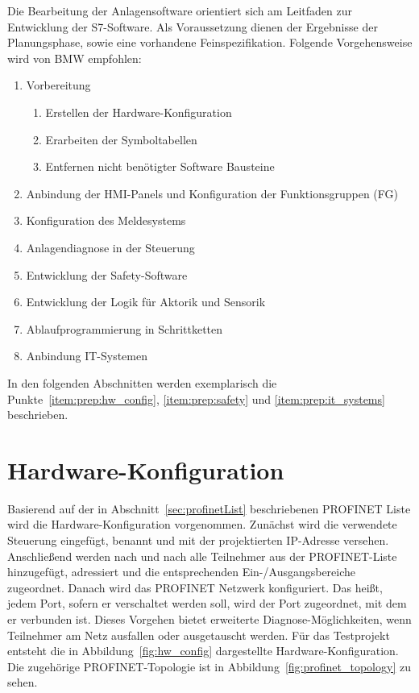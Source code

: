 Die Bearbeitung der Anlagensoftware orientiert sich am Leitfaden zur Entwicklung der S7-Software. Als Voraussetzung dienen der Ergebnisse der Planungsphase, sowie eine vorhandene Feinspezifikation. Folgende Vorgehensweise wird von BMW empfohlen:
\begin{enumerate}
    \itemsep 0.05em
    \item Vorbereitung
    \begin{enumerate}
        \itemsep 0.05em
        \item {Erstellen der Hardware-Konfiguration}\label{item:prep:hw_config}
        \item Erarbeiten der Symboltabellen
        \item Entfernen nicht benötigter Software Bausteine
    \end{enumerate} 
    \item Anbindung der HMI-Panels und Konfiguration der Funktionsgruppen (FG)
    \item Konfiguration des Meldesystems
    \item Anlagendiagnose in der Steuerung
    \item {Entwicklung der Safety-Software}\label{item:prep:safety}
    \item Entwicklung der Logik für Aktorik und Sensorik
    \item Ablaufprogrammierung in Schrittketten
    \item Anbindung IT-Systemen\label{item:prep:it_systems}
\end{enumerate}

In den folgenden Abschnitten werden exemplarisch die Punkte~\ref{item:prep:hw_config}, \ref{item:prep:safety} und \ref{item:prep:it_systems} beschrieben. 

\section{Hardware-Konfiguration}
\label{sec:hw_config}
Basierend auf der in Abschnitt~\ref{sec:profinetList} beschriebenen PROFINET Liste wird die Hardware-Konfiguration vorgenommen. Zunächst wird die verwendete Steuerung eingefügt, benannt und mit der projektierten IP-Adresse versehen. Anschließend werden nach und nach alle Teilnehmer aus der PROFINET-Liste hinzugefügt, adressiert und die entsprechenden Ein-/Ausgangsbereiche zugeordnet. Danach wird das PROFINET Netzwerk konfiguriert. Das heißt, jedem Port, sofern er verschaltet werden soll, wird der Port zugeordnet, mit dem er verbunden ist. Dieses Vorgehen bietet erweiterte Diagnose-Möglichkeiten, wenn Teilnehmer am Netz ausfallen oder ausgetauscht werden. Für das Testprojekt entsteht die in Abbildung~\ref{fig:hw_config} dargestellte Hardware-Konfiguration. Die zugehörige PROFINET-Topologie ist in Abbildung~\ref{fig:profinet_topology} zu sehen.\par

